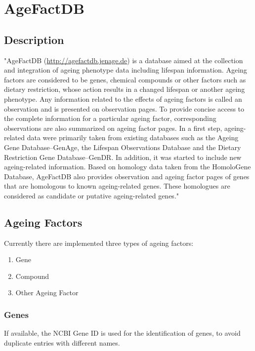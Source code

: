 \documentclass[12pt,a4paper,notitlepage,twoside]{report}
\begin{document}
\section{AgeFactDB}
\label{sec:agefactdb}

\subsection{Description}
"AgeFactDB (\href{http://agefactdb.jenage.de}{http://agefactdb.jenage.de}) is a database aimed at the collection and integration of ageing phenotype data including lifespan information. Ageing factors are considered to be genes, chemical compounds or other factors such as dietary restriction, whose action results in a changed lifespan or another ageing phenotype. Any information related to the effects of ageing factors is called an observation and is presented on observation pages. To provide concise access to the complete information for a particular ageing factor, corresponding observations are also summarized on ageing factor pages. In a first step, ageing-related data were primarily taken from existing databases such as the Ageing Gene Database--GenAge, the Lifespan Observations Database and the Dietary Restriction Gene Database--GenDR. In addition, it was started to include new ageing-related information. Based on homology data taken from the HomoloGene Database, AgeFactDB also provides observation and ageing factor pages of genes that are homologous to known ageing-related genes. These homologues are considered as candidate or putative ageing-related genes." \cite{huehne2014}

\subsection{Ageing Factors}
Currently there are implemented three types of ageing factors:
\begin{enumerate}[label=\textbf{\arabic*.}]
\item Gene
\item Compound
\item Other Ageing Factor
\end{enumerate}

\subsubsection{Genes}
If available, the NCBI Gene ID is used for the identification of genes, to avoid duplicate entries with different names.
\end{document}
